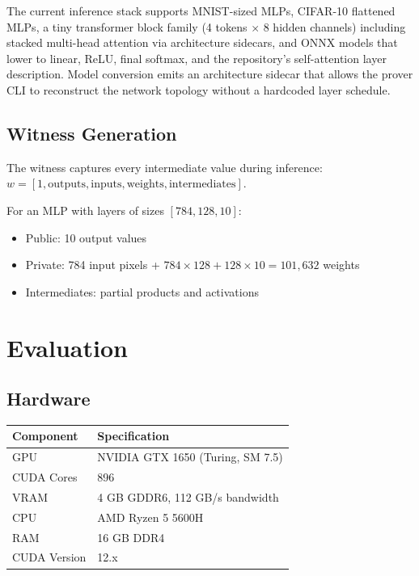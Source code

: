 \documentclass[11pt,a4paper]{article}
\begin{document}
The current inference stack supports MNIST-sized MLPs, CIFAR-10 flattened
MLPs, a tiny transformer block family (4 tokens $\times$ 8 hidden
channels) including stacked multi-head attention via architecture sidecars,
and ONNX models that lower to linear, ReLU, final softmax, and
the repository's self-attention layer description. Model conversion emits an
architecture sidecar that allows the prover CLI to reconstruct the network
topology without a hardcoded layer schedule.

\subsection{Witness Generation}

The witness captures every intermediate value during inference:
$w = [1, \text{outputs}, \text{inputs}, \text{weights}, \text{intermediates}]$.

For an MLP with layers of sizes $[784, 128, 10]$:
\begin{itemize}
  \item Public: 10 output values
  \item Private: 784 input pixels + $784 \times 128 + 128 \times 10 = 101,\!632$ weights
  \item Intermediates: partial products and activations
\end{itemize}

\section{Evaluation}

\subsection{Hardware}

\begin{tabular}{ll}
\toprule
Component & Specification \\
\midrule
GPU & NVIDIA GTX 1650 (Turing, SM 7.5) \\
CUDA Cores & 896 \\
VRAM & 4 GB GDDR6, 112 GB/s bandwidth \\
CPU & AMD Ryzen 5 5600H \\
RAM & 16 GB DDR4 \\
CUDA Version & 12.x \\
\bottomrule
\end{tabular}
\end{document}
